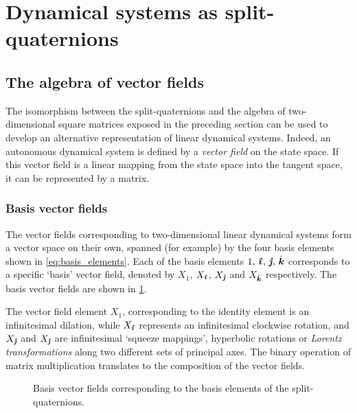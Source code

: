 \section{Dynamical systems as split-quaternions}
\label{sec:system_classification}
\subsection{The algebra of vector fields}
\label{ssec:vf_algebra}
The isomorphism between the split-quaternions and the algebra of two-dimensional square matrices exposed in the preceding section can be used to develop an alternative representation of linear dynamical systems. Indeed, an autonomous dynamical system is defined by a \emph{vector field} on the state space. If this vector field is a linear mapping from the state space into the tangent space, it can be represented by a matrix. 

\subsubsection{Basis vector fields} The vector fields corresponding to two-dimensional linear dynamical systems form a vector space on their own, spanned (for example) by the four basis elements shown in \cref{eq:basis_elements}. Each of the basis elements \(1,\,\quati,\,\quatj,\,\quatk\) corresponds to a specific `basis' vector field, denoted by \(X_1\), \(X_{\quati}\), \(X_{\quatj}\) and \(X_{\quatk}\) respectively. The basis vector fields are shown in \cref{fig:basis_vf}. 

The vector field element \(X_1\), corresponding to the identity element is an infinitesimal dilation, while \(X_{\quati}\) represents an infinitesimal clockwise rotation, and \(X_{\quatj}\) and \(X_{\quatj}\) are infinitesimal `squeeze mappings', hyperbolic rotations or \emph{Lorentz transformations} along two different sets of principal axes. The binary operation of matrix multiplication translates to the composition of the vector fields.
\begin{figure}[ht!]
    \centering
    
    \caption{Basis vector fields corresponding to the basis elements of the split-quaternions.}
    \label{fig:basis_vf}
\end{figure}

